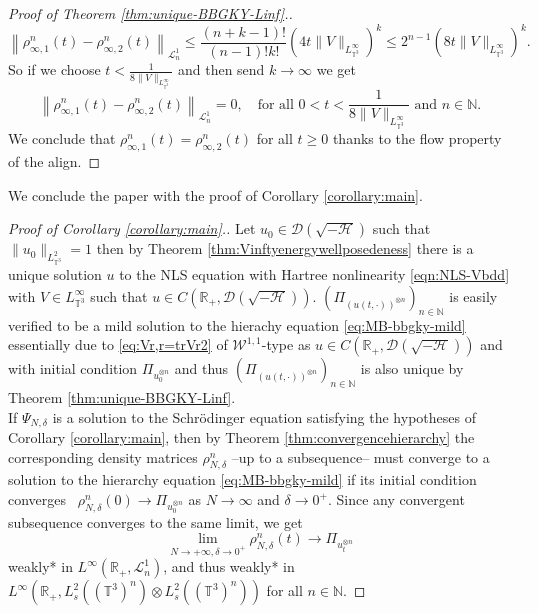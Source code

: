\begin{proof}[Proof of Theorem \ref{thm:unique-BBGKY-Linf}.]
\[  \left\| \rho^n_{\infty, 1} (t) - \rho^n_{\infty, 2} (t) \right\|_{\mathcal{L}^1_n}
     \leqslant \frac{(n + k - 1) !}{(n - 1) !k!} \left( 4 t \| V
     \|_{L_{\mathbb{T}^3}^{\infty}} \right)^k  \leqslant 2^{n - 1} \left( 8 t \| V
     \|_{L_{\mathbb{T}^3}^{\infty}} \right)^k . \]
  So if we choose $t < \frac{1}{8 \| V \|_{L_{\mathbb{T}^3}^{\infty}}}$ and
  then send $k \rightarrow \infty$ we get
  \[ 
  \left\| \rho^n_{\infty, 1} (t) - \rho^n_{\infty, 2} (t) \right\|_{\mathcal{L}^1_n} =
     0, \quad \text{for all } 0 < t < \frac{1}{8 \| V
     \|_{L_{\mathbb{T}^3}^{\infty}}} \text{ and } n \in \mathbb{N}.
      \]
  We conclude that $\rho^n_{\infty, 1} (t) = \rho^n_{\infty, 2} (t)$ for all
  $t \geqslant 0$ thanks to the flow property of the align.
\end{proof}

We conclude the paper with the proof of Corollary \ref{corollary:main}.

\begin{proof}[Proof of Corollary \ref{corollary:main}.]
  Let $u_0 \in \mathcal{D} \left( \sqrt{- \mathcal{H}} \right)$ such that $\|
  u_0 \|_{L_{\mathbb{T}^3}^2} = 1$ then by Theorem
  \ref{thm:Vinftyenergywellposedeness} there is a unique solution $u$ to
  the NLS equation with Hartree nonlinearity \eqref{eqn:NLS-Vbdd} with $V \in
  L_{\mathbb{T}^3}^{\infty}$ such that $u \in C \left( \mathbb{R}_+,
  \mathcal{D} \left( \sqrt{- \mathcal{H}} \right) \right)$. $(\Pi_{(u (t, \cdot))^{\otimes n}})_{n \in \mathbb{N}}$ is easily verified
  to be a mild solution to the hierachy equation \eqref{eq:MB-bbgky-mild}
  essentially due to \eqref{eq:Vr,r=trVr2} of $\mathcal{W}^{1, 1}$-type as $u
  \in C \left( \mathbb{R}_+, \mathcal{D} \left( \sqrt{- \mathcal{H}} \right)
  \right)$ and with initial condition $\Pi_{u_0^{\otimes n}} $ and thus $(\Pi_{(u (t, \cdot))^{\otimes n}})_{n \in \mathbb{N}}$ is also
  unique by Theorem \ref{thm:unique-BBGKY-Linf}.\\
  
  If $\Psi_{N, \delta}$ is a solution to the Schr{\"o}dinger equation satisfying the hypotheses of Corollary
  \ref{corollary:main}, then by Theorem \ref{thm:convergencehierarchy} the
  corresponding density matrices $\rho^n_{N, \delta}$ --up to a subsequence--
  must converge to a solution to the hierarchy equation
  \eqref{eq:MB-bbgky-mild} if its initial condition converges \ $\rho^n_{N,
  \delta} (0) \rightarrow \Pi_{u_0^{\otimes n}}$ as $N \rightarrow \infty$ and
  $\delta \rightarrow 0^+$. Since any convergent subsequence converges to the same limit, we get
  \[ \lim_{N \rightarrow + \infty, \delta \rightarrow 0^+} \rho^n_{N, \delta}(t)
    \rightarrow\Pi_{u_t^{\otimes n}} \]
  weakly* in $L^{\infty} (\mathbb{R}_+, \mathcal{L}^1_n)$, and thus weakly* in
  $L^{\infty} (\mathbb{R}_+, L^2_s ((\mathbb{T}^3)^n) \otimes L_s^2
  ((\mathbb{T}^3)^n))$ for all $n \in \mathbb{N}.$
\end{proof}


